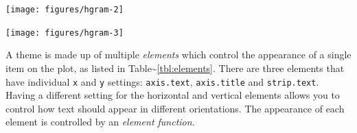 \begin{flushleft}\texttt{[image: figures/hgram-2]} \end{flushleft}

\begin{Shaded}
\begin{Highlighting}[]
\NormalTok{>}\StringTok{ }
\ErrorTok{>}\StringTok{ }
\ErrorTok{>}\StringTok{ }
\ErrorTok{>}\StringTok{ }\StringTok{ }
\end{Highlighting}
\end{Shaded}

\begin{flushleft}\texttt{[image: figures/hgram-3]} \end{flushleft}

\begin{Shaded}
\begin{Highlighting}[]
\NormalTok{>}\StringTok{ }
\ErrorTok{>}\StringTok{ }
\ErrorTok{>}\StringTok{ }
\end{Highlighting}
\end{Shaded}


A theme is made up of multiple \emph{elements} which control the
appearance of a single item on the plot, as listed in
Table\textasciitilde{}\ref{tbl:elements}. There are three elements that
have individual \texttt{x} and \texttt{y} settings: \texttt{axis.text},
\texttt{axis.title} and \texttt{strip.text}. Having a different setting
for the horizontal and vertical elements allows you to control how text
should appear in different orientations. The appearance of each element
is controlled by an \emph{element function}. 

